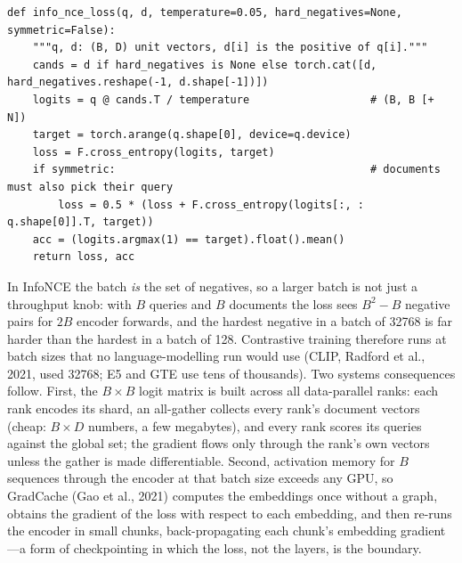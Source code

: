 \begin{lstlisting}[caption={InfoNCE with in-batch and optional hard negatives.},label={lst:encoders:infonce}]
def info_nce_loss(q, d, temperature=0.05, hard_negatives=None, symmetric=False):
    """q, d: (B, D) unit vectors, d[i] is the positive of q[i]."""
    cands = d if hard_negatives is None else torch.cat([d, hard_negatives.reshape(-1, d.shape[-1])])
    logits = q @ cands.T / temperature                   # (B, B [+ N])
    target = torch.arange(q.shape[0], device=q.device)
    loss = F.cross_entropy(logits, target)
    if symmetric:                                        # documents must also pick their query
        loss = 0.5 * (loss + F.cross_entropy(logits[:, : q.shape[0]].T, target))
    acc = (logits.argmax(1) == target).float().mean()
    return loss, acc
\end{lstlisting}

\begin{systemslens}
In InfoNCE the batch \emph{is} the set of negatives, so a larger batch is not just a throughput knob:
with $B$ queries and $B$ documents the loss sees $B^2-B$ negative pairs for $2B$ encoder forwards,
and the hardest negative in a batch of \num{32768} is far harder than the hardest in a batch of 128.
Contrastive training therefore runs at batch sizes that no language-modelling run would use (CLIP,
Radford et al., 2021, used \num{32768}; E5 and GTE use tens of thousands). Two systems consequences
follow. First, the $B\times B$ logit matrix is built across all data-parallel ranks: each rank
encodes its shard, an all-gather collects every rank's document vectors (cheap: $B\times D$ numbers,
a few megabytes), and every rank scores its queries against the global set; the gradient flows only
through the rank's own vectors unless the gather is made differentiable. Second, activation memory
for $B$ sequences through the encoder at that batch size exceeds any GPU, so GradCache (Gao et al.,
2021) computes the embeddings once without a graph, obtains the gradient of the loss with respect to
each embedding, and then re-runs the encoder in small chunks, back-propagating each chunk's
embedding gradient---a form of checkpointing in which the loss, not the layers, is the boundary.
\end{systemslens}

